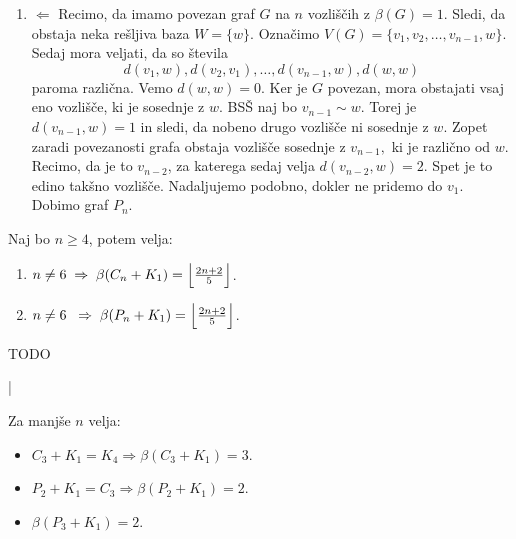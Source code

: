 \documentclass[mat1, tisk]{fmfdelo}
\newcommand{\1}{(1, 1, \ldots, 1)}
\newcommand{\2}{(2, 2, \ldots, 2)}
\begin{document}
\begin{dokaz}
\begin{enumerate}
        \item $\Leftarrow$
        Recimo, da imamo povezan graf $G$ na $n$ vozliščih z $\beta(G) = 1.$ Sledi, da obstaja neka 
        rešljiva baza $W = \{ w \}.$ Označimo $V(G) = \{ v_1, v_2, \ldots , v_{n-1}, w\}.$ Sedaj mora 
        veljati, da so števila 
        $$ d(v_1, w),  d(v_2, v_1), \ldots, d(v_{n-1}, w), d(w, w) $$
        paroma različna. Vemo $d(w, w) = 0$. Ker je $G$ povezan, mora obstajati vsaj eno vozlišče, 
        ki je sosednje z $w$. BSŠ naj bo $v_{n-1} \sim w$. Torej je $d(v_{n-1}, w) = 1$ in sledi, 
        da nobeno drugo vozlišče ni sosednje z $w$. Zopet zaradi povezanosti grafa obstaja vozlišče 
        sosednje z $v_{n-1},$ ki je različno od $w$. Recimo, da je to $v_{n-2}$, za katerega sedaj 
        velja $d(v_{n-2}, w) = 2.$ Spet je to edino takšno vozlišče. Nadaljujemo podobno, 
        dokler ne pridemo do $v_1.$ Dobimo graf $P_n.$
    \end{enumerate}
\end{dokaz}


\begin{trditev} \label{trd:mdim_spojev}
    Naj bo $n\geq 4$, potem velja:
    \begin{enumerate}
        \item $n \neq 6 \; \Rightarrow \; \beta(C_n + K_1) = 
        \Bigl \lfloor \frac{2n + 2}{5}\Bigr \rfloor$.
        \item $n \neq 6 \; \; \Rightarrow \; \beta(P_n + K_1) = 
        \Bigl \lfloor \frac{2n + 2}{5}\Bigr \rfloor$.
    \end{enumerate}
\end{trditev}

\begin{dokaz}
    TODO
\end{dokaz}

|\begin{opomba}
    Za manjše $n$ velja:
    \begin{itemize}
        \item $C_3 + K_1 = K_4 \Rightarrow \beta(C_3 + K_1) = 3.$
        \item $P_2 + K_1 = C_3 \Rightarrow \beta(P_2 + K_1) = 2.$
        \item $\beta(P_3 + K_1) = 2.$
    \end{itemize}
    
\end{opomba}


\end{document}

